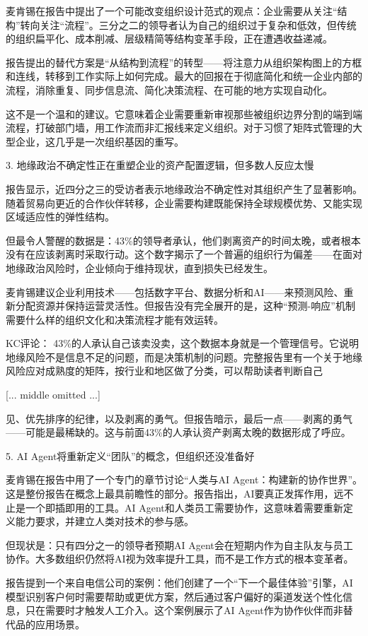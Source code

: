 \documentclass[11pt]{ctexart}
\begin{document}
麦肯锡在报告中提出了一个可能改变组织设计范式的观点：企业需要从关注“结构”转向关注“流程”。三分之二的领导者认为自己的组织过于复杂和低效，但传统的组织扁平化、成本削减、层级精简等结构变革手段，正在遭遇收益递减。

报告提出的替代方案是“从结构到流程”的转型——将注意力从组织架构图上的方框和连线，转移到工作实际上如何完成。最大的回报在于彻底简化和统一企业内部的流程，消除重复、同步信息流、简化决策流程、在可能的地方实现自动化。

这不是一个温和的建议。它意味着企业需要重新审视那些被组织边界分割的端到端流程，打破部门墙，用工作流而非汇报线来定义组织。对于习惯了矩阵式管理的大型企业，这几乎是一次组织基因的重写。

3. 地缘政治不确定性正在重塑企业的资产配置逻辑，但多数人反应太慢

报告显示，近四分之三的受访者表示地缘政治不确定性对其组织产生了显著影响。随着贸易向更近的合作伙伴转移，企业需要构建既能保持全球规模优势、又能实现区域适应性的弹性结构。

但最令人警醒的数据是：43\%的领导者承认，他们剥离资产的时间太晚，或者根本没有在应该剥离时采取行动。这个数字揭示了一个普遍的组织行为偏差——在面对地缘政治风险时，企业倾向于维持现状，直到损失已经发生。

麦肯锡建议企业利用技术——包括数字平台、数据分析和AI——来预测风险、重新分配资源并保持运营灵活性。但报告没有完全展开的是，这种“预测-响应”机制需要什么样的组织文化和决策流程才能有效运转。

KC评论： 43\%的人承认自己该卖没卖，这个数据本身就是一个管理信号。它说明地缘风险不是信息不足的问题，而是决策机制的问题。完整报告里有一个关于地缘风险应对成熟度的矩阵，按行业和地区做了分类，可以帮助读者判断自己

[... middle omitted ...]

见、优先排序的纪律，以及剥离的勇气。但报告暗示，最后一点——剥离的勇气——可能是最稀缺的。这与前面43\%的人承认资产剥离太晚的数据形成了呼应。

5. AI Agent将重新定义“团队”的概念，但组织还没准备好

麦肯锡在报告中用了一个专门的章节讨论“人类与AI Agent：构建新的协作世界”。这是整份报告在概念上最具前瞻性的部分。报告指出，AI要真正发挥作用，远不止是一个即插即用的工具。AI Agent和人类员工需要协作，这意味着需要重新定义能力要求，并建立人类对技术的参与感。

但现状是：只有四分之一的领导者预期AI Agent会在短期内作为自主队友与员工协作。大多数组织仍然将AI视为效率提升工具，而不是工作方式的根本变革者。

报告提到一个来自电信公司的案例：他们创建了一个“下一个最佳体验”引擎，AI模型识别客户何时需要帮助或更优方案，然后通过客户偏好的渠道发送个性化信息，只在需要时才触发人工介入。这个案例展示了AI Agent作为协作伙伴而非替代品的应用场景。
\end{document}
